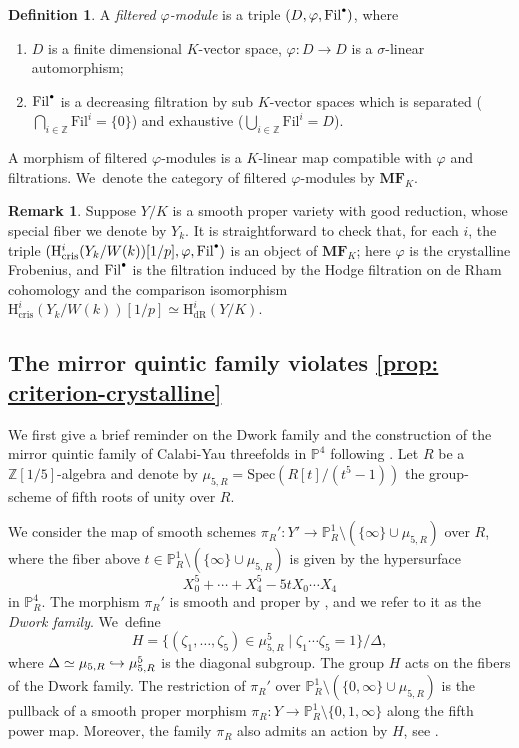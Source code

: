 \documentclass[JEP,XML,SOM,Unicode,published]{cedram}
\newcommand\hto{\mathrel{\lhook\joinrel\to}}
\newcommand{\csbullet}{{\raisebox{1pt}{$\scriptscriptstyle\bullet$}}}
\numberwithin{equation}{subsection}
\theoremstyle{definition}
\newtheorem{defn}[thm]{Definition}
\newtheorem{rmk}[thm]{Remark}
\newcommand\Fil{\mathrm{Fil}}
\newcommand\cris{\mathrm{cris}}
\newcommand{\Z}{\mathbb Z}
\newcommand{\MF}{\mathbf{MF}}
\let\mb\mathbb
\begin{document}
\begin{defn}
A \emph{filtered $\varphi$-module} is a triple $(D, \varphi, \Fil^{\csbullet})$, where
\begin{enumerate}\renewcommand{\theenumi}{\roman{enumi}}
\item $D$ is a finite dimensional $K$-vector space, $\varphi: D\rightarrow D$ is a $\sigma$-linear automorphism;
\item $\Fil^{\csbullet}$ is a decreasing filtration by sub $K$-vector spaces which is separated (\ie $\bigcap_{i\in \mb{Z}} \Fil^i =\{0\}$) and exhaustive (\ie $\bigcup_{i\in \mb{Z}} \Fil^i=D$).
\end{enumerate}
A morphism of filtered $\varphi$-modules is a $K$-linear map compatible with $\varphi$ and filtrations. We~denote the category of filtered $\varphi$-modules by $\MF_K$.
\end{defn}

\begin{rmk}
Suppose $Y/K$ is a smooth proper variety with good reduction, whose special fiber we denote by $Y_k$. It is straightforward to check that, for each $i$, the triple $(\mathrm{H}^i_{\cris}(Y_k/W(k))[1/p], \varphi, \Fil^{\csbullet})$ is an object of $\MF_K$; here $\varphi$ is the crystalline Frobenius, and $\Fil^{\csbullet}$ is the filtration induced by the Hodge filtration on de Rham cohomology and the comparison isomorphism $\mathrm{H}^i_{\cris}(Y_k/W(k))[1/p]\simeq \mathrm{H}^i_{\mathrm{dR}}(Y/K)$.
\end{rmk}

\subsection{The mirror quintic family violates \texorpdfstring{\cref{prop: criterion-crystalline}}{the criterion}}
We first give a brief reminder on the Dwork family and the construction of the mirror quintic family of Calabi-Yau threefolds in $\mathbb{P}^4$ following \cite{Katz-Another-Look-at-the-Dwork-Family}. Let $R$ be a $\Z[1/5]$-algebra and denote by $\mu_{5,R}=\mathrm{Spec}(R[t]/(t^5-1))$ the group-scheme of fifth roots of unity over $R$.

We consider the map of smooth schemes $\pi_R'\colon Y'\to\mathbb{P}_{R}^1\setminus(\{\infty\}\cup\mu_{5,R})$ over $R$, where the fiber above $t\in \mathbb{P}_{R}^1\setminus(\{\infty\}\cup\mu_{5,R})$ is given by the hypersurface
\[
X_0^5+\cdots+X_4^5-5tX_0\cdots X_4
\]
in $\mb{P}_R^4$. The morphism $\pi_{R}'$ is smooth and proper by \cite[Lem.\,2.1]{Katz-Another-Look-at-the-Dwork-Family}, and we refer to it as the \emph{Dwork family}. We~define
\[
H=\{(\zeta_1,\dots,\zeta_5)\in\mu_{5,R}^5\mid\zeta_1\cdots\zeta_5=1\}/\Delta,
\]
where $\Delta\simeq \mu_{5, R}\hto\mu_{5,R}^5$ is the diagonal subgroup. The group $H$ acts on the fibers of the Dwork family. The restriction of $\pi_R'$ over $\mathbb{P}^1_R\setminus(\{0,\infty\}\cup\mu_{5,R})$ is the pullback of a smooth proper morphism $\pi_R\colon Y\to\mathbb{P}^1_R\setminus\{0,1,\infty\}$ along the fifth power map. Moreover, the family $\pi_R$ also admits an action by $H$, see \cite[p.\,102]{Katz-Another-Look-at-the-Dwork-Family}.
\end{document}
